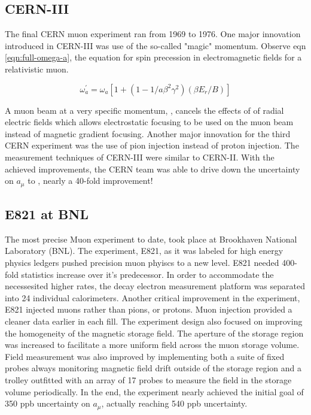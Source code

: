 \subsection{CERN-III}
The final CERN muon \gmtwo experiment ran from 1969 to 1976.  One major innovation introduced in CERN-III was use of the so-called "magic" momentum. Observe eqn \ref{eqn:full-omega-a}, the equation for spin precession in electromagnetic fields for a relativistic muon.

\begin{equation}
\omega^\prime_a = \omega_a[1 + (1 - 1 / a \beta^2 \gamma^2)(\beta E_r / B)]
\label{eqn:full-omega-a}
\end{equation}

A muon beam at a very specific momentum, , cancels the effects of of radial electric fields which allows electrostatic focusing to be used on the muon beam instead of magnetic gradient focusing.  Another major innovation for the third CERN experiment was the use of pion injection instead of proton injection.  The measurement techniques of CERN-III were similar to CERN-II.  With the achieved improvements, the CERN team was able to drive down the uncertainty on $a_\mu$ to , nearly a 40-fold improvement!

\subsection{E821 at BNL}
The most precise Muon \gmtwo experiment to date, took place at Brookhaven National Laboratory (BNL). The experiment, E821, as it was labeled for high energy physics ledgers pushed precision muon phyiscs to a new level.  E821 needed 400-fold statistics increase over it's predecessor.  In order to accommodate the necessesited higher rates, the decay electron measurement platform was separated into 24 individual calorimeters.  Another critical improvement in the experiment, E821 injected muons rather than pions, or protons.  Muon injection provided a cleaner data earlier in each fill.  The experiment design also focused on improving the homogeneity of the magnetic storage field.  The aperture of the storage region was increased to facilitate a more uniform field across the muon storage volume.  Field measurement was also improved by implementing both a suite of fixed probes always monitoring magnetic field drift outside of the storage region and a trolley outfitted with an array of 17 probes to measure the field in the storage volume periodically.  In the end, the experiment nearly achieved the initial goal of 350 ppb uncertainty on $a_\mu$, actually reaching 540 ppb uncertainty.

